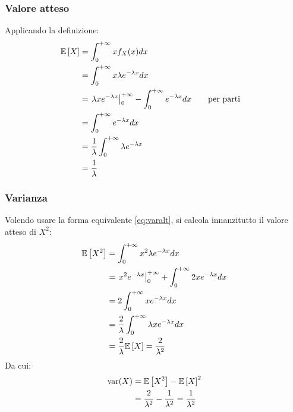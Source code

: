 \subsubsection{Valore atteso}
Applicando la definizione:
\begin{align*}
	\mathbb{E}\left[ X \right] & = \int_0^{+\infty} x f_X(x) dx                                                                    \\
	       & = \int_0^{+\infty} x\lambda e^{-\lambda x}dx                                                      \\
	       & = \left. \lambda x e^{-\lambda x} \right\rvert_{0}^{+\infty} - \int_0^{+\infty} e^{-\lambda x} dx & \quad & \text{per parti} \\
	       & = \int_0^{+\infty} e^{-\lambda x} dx                                                              \\
	       & = \frac{1}{\lambda} \int_0^{+\infty} \lambda e^{-\lambda x}                                       \\
	       & = \frac{1}{\lambda}
\end{align*}


\subsubsection{Varianza}
Volendo usare la forma equivalente \eqref{eq:varalt}, si calcola innanzitutto il valore atteso di $X^2$:
\begin{align*}
	\mathbb{E}\left[ X^2 \right] & = \int_0^{+\infty} x^2\lambda e^{-\lambda x} dx                                \\
	         & = \left. x^2 e^{-\lambda x} \right\rvert_{0}^{+\infty} + \int_0^{+\infty} 2xe^{-\lambda x} dx \\
	         & = 2\int_0^{+\infty} xe^{-\lambda x}dx                                          \\
	         & = \frac{2}{\lambda} \int_0^{+\infty} \lambda xe^{-\lambda x}dx                 \\
	         & = \frac{2}{\lambda} \mathbb{E}\left[ X \right] = \frac{2}{\lambda^2}
\end{align*}
Da cui:
\begin{align*}
	\operatorname{var}(X) & = \mathbb{E}\left[ X^2 \right] - \mathbb{E}\left[ X \right]^2                                           \\
	        & = \frac{2}{\lambda^2}-\frac{1}{\lambda^2} = \frac{1}{\lambda^2}
\end{align*}


